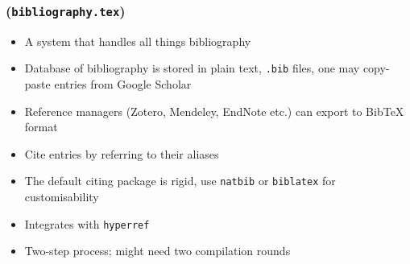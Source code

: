 \documentclass[colorlinks]{beamer} %
\begin{document}
  \subsubsection{}
  \begin{frame}
    \frametitle{ \\ (\texttt{bibliography.tex})}
    \begin{itemize}
     \item A system that handles all things bibliography
     \item Database of bibliography is stored in plain text, \texttt{.bib} files, one may copy-paste entries from Google Scholar
     \item Reference managers (Zotero, Mendeley, EndNote etc.) can export to BibTeX format
     \item Cite entries by referring to their aliases
     \item The default citing package is rigid, use \texttt{natbib} or \texttt{biblatex} for customisability
     \item Integrates with \texttt{hyperref}
     \item Two-step process; might need two compilation rounds
    \end{itemize}
  \end{frame}
  
\end{document}
